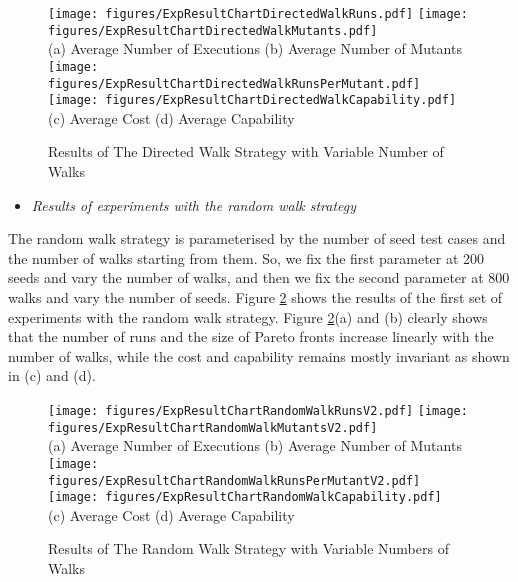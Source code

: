 \documentclass[preprint,1p,authoryear,times]{elsarticle}
\begin{document}
\begin{figure}[htbp]
	\centering
	\texttt{[image: figures/ExpResultChartDirectedWalkRuns.pdf]}
	\texttt{[image: figures/ExpResultChartDirectedWalkMutants.pdf]}\\
	\scriptsize{(a) Average Number of Executions  \hspace{2cm} (b) Average Number of Mutants} \\
	\texttt{[image: figures/ExpResultChartDirectedWalkRunsPerMutant.pdf]}
	\texttt{[image: figures/ExpResultChartDirectedWalkCapability.pdf]} \\
	\scriptsize {(c) Average Cost \hspace{2.7cm} (d) Average Capability}\\
	\caption{Results of The Directed Walk Strategy with Variable Number of Walks}
	\label{fig:DirectedWalkResultChart}
\end{figure}

\begin{itemize}
\item \emph{Results of experiments with the random walk strategy}
\end{itemize}

The random walk strategy is parameterised by the number of seed test cases and the number of walks starting from them. So, we fix the first parameter at 200 seeds and vary the number of walks, and then we fix the second parameter at 800 walks and vary the number of seeds. Figure \ref{fig:RandomWalkResultChart} shows the results of the first set of experiments with the random walk strategy. Figure \ref{fig:RandomWalkResultChart}(a) and (b) clearly shows that the number of runs and the size of Pareto fronts increase linearly with the number of walks, while the cost and capability remains mostly invariant as shown in (c) and (d). 

\begin{figure}[htbp]
	\centering
	\texttt{[image: figures/ExpResultChartRandomWalkRunsV2.pdf]}
	\texttt{[image: figures/ExpResultChartRandomWalkMutantsV2.pdf]}\\
		\scriptsize{(a) Average Number of Executions \hspace{2cm} (b) Average Number of Mutants}\\
	\texttt{[image: figures/ExpResultChartRandomWalkRunsPerMutantV2.pdf]}
	\texttt{[image: figures/ExpResultChartRandomWalkCapability.pdf]}\\
	\scriptsize{(c) Average Cost  \hspace{3cm} (d) Average Capability} \\ 
	\caption{Results of The Random Walk Strategy with Variable Numbers of Walks}
	\label{fig:RandomWalkResultChart}
\end{figure}
\end{document}
